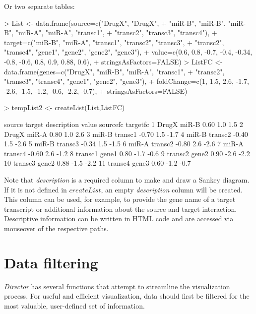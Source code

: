 \documentclass[a4paper]{article}
\begin{document}
\noindent Or two separate tables:
\begin{Schunk}
\begin{Sinput}
> List <- data.frame(source=c("DrugX", "DrugX",
+         "miR-B", "miR-B", "miR-B", "miR-A", "miR-A", "transc1",
+         "transc2", "transc3", "transc4"),
+     target=c("miR-B", "miR-A", "transc1", "transc2", "transc3",
+         "transc2", "transc4", "gene1", "gene2", "gene2", "gene3"),
+     value=c(0.6, 0.8, -0.7, -0.4, -0.34, -0.8, -0.6, 0.8, 0.9, 0.88, 0.6),
+     	    stringsAsFactors=FALSE)
> ListFC <- data.frame(genes=c("DrugX", "miR-B", "miR-A", "transc1",
+     "transc2", "transc3", "transc4", "gene1", "gene2", "gene3"),
+     foldChange=c(1, 1.5, 2.6, -1.7, -2.6, -1.5, -1.2, -0.6, -2.2, -0.7),
+         stringsAsFactors=FALSE)
\end{Sinput}
\end{Schunk}
\begin{Schunk}
\begin{Sinput}
> tempList2 <- createList(List,ListFC)
\end{Sinput}
\begin{Soutput}
    source  target description value sourcefc targetfc
1    DrugX   miR-B              0.60      1.0      1.5
2    DrugX   miR-A              0.80      1.0      2.6
3    miR-B transc1             -0.70      1.5     -1.7
4    miR-B transc2             -0.40      1.5     -2.6
5    miR-B transc3             -0.34      1.5     -1.5
6    miR-A transc2             -0.80      2.6     -2.6
7    miR-A transc4             -0.60      2.6     -1.2
8  transc1   gene1              0.80     -1.7     -0.6
9  transc2   gene2              0.90     -2.6     -2.2
10 transc3   gene2              0.88     -1.5     -2.2
11 transc4   gene3              0.60     -1.2     -0.7
\end{Soutput}
\end{Schunk}

\noindent Note that \textit{description} is a required column to make and draw a Sankey diagram. If it is not defined in $createList$, an empty \textit{description} column will be created. This column can be used, for example, to provide the gene name of a target transcript or additional information about the source and target interaction. Descriptive information can be written in HTML code and are accessed via mouseover of the respective paths.

\section{Data filtering}
\textit{Director} has several functions that attempt to streamline the visualization process. For useful and efficient visualization, data should first be filtered for the most valuable, user-defined set of information.
\end{document}
